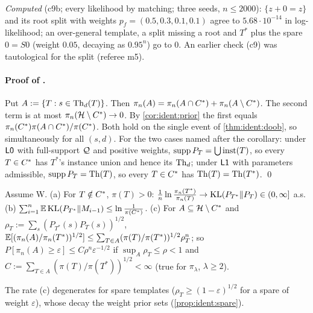 \emph{Computed} (c9b; every likelihood by matching; three seeds, $n\le2000$): $\{z+0=z\}$ and its root split with weights $p_f=(0.5,0.3,0.1,0.1)$ agree to $5.68\cdot10^{-14}$ in log-likelihood; an over-general template, a split missing a root and $T^*$ plus the spare $0=S0$ (weight $0.05$, decaying as $0.95^n$) go to $0$. An earlier check (c9) was tautological for the split (referee m5).

\paragraph{Proof of .} Put $A:=\{T:s\in\mathrm{Th}_d(T)\}$. Then $\pi_n(A)=\pi_n(A\cap C^{*})+\pi_n(A\setminus C^{*})$. The second term is at most $\pi_n(\mathcal{H}\setminus C^{*})\to0$. By \cref{cor:ident:prior} the first equals $\pi_n(C^{*})\pi(A\cap C^{*})/\pi(C^{*})$. Both hold on the single event of \cref{thm:ident:doob}, so simultaneously for all $(s,d)$. For the two cases named after the corollary: under $\mathord{\mathsf{L0}}$ with full-support $\mathcal{Q}$ and positive weights, $\operatorname{supp}P_T=\bigcup\mathrm{inst}(T)$, so every $T\in C^{*}$ has $T^*$'s instance union and hence its $\mathrm{Th}_d$; under $\mathord{\mathsf{L1}}$ with parameters admissible, $\operatorname{supp}P_T=\mathrm{Th}(T)$, so every $T\in C^{*}$ has $\mathrm{Th}(T)=\mathrm{Th}(T^*)$. \qed

\begin{proposition}[Rates]\label{prop:ident:rates}
Assume W. (a) For $T\notin C^{*}$, $\pi(T)>0$: $\frac1n\ln\frac{\pi_n(T^*)}{\pi_n(T)}\to\mathrm{KL}(P_{T^*}\|P_T)\in(0,\infty]$ a.s. (b) $\sum_{i=1}^n\mathbb{E}\,\mathrm{KL}(P_{T^*}\|M_{i-1})\le\ln\frac1{\pi(C^{*})}$. (c) For $A\subseteq\mathcal{H}\setminus C^{*}$ and $\rho_T:=\sum_s(P_{T^*}(s)P_T(s))^{1/2}$, $\mathbb{E}[(\pi_n(A)/\pi_n(T^*))^{1/2}]\le\sum_{T\in A}(\pi(T)/\pi(T^*))^{1/2}\rho_T^n$; so $P[\pi_n(A)\ge\varepsilon]\le C\rho^n\varepsilon^{-1/2}$ if $\sup_A\rho_T\le\rho<1$ and $C:=\sum_{T\in A}(\pi(T)/\pi(T^*))^{1/2}<\infty$ (true for $\pi_\lambda$, $\lambda\ge2$).
\end{proposition}

\noindent The rate (c) degenerates for spare templates ($\rho_T\ge(1-\varepsilon)^{1/2}$ for a spare of weight $\varepsilon$), whose decay the weight prior sets (\cref{prop:ident:spare}).

